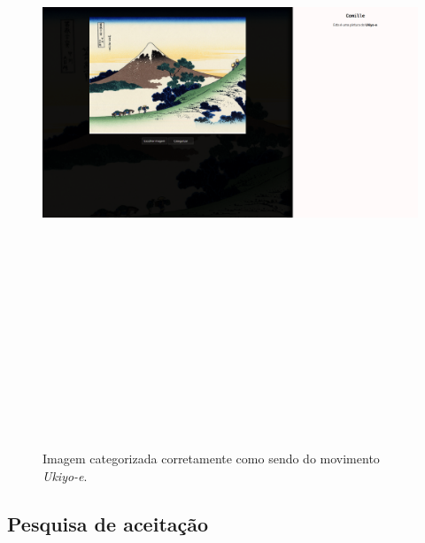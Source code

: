 \documentclass[12pt, a4paper]{article}
\begin{document}
\begin{figure}[H]
	\centering
	\includegraphics[width=\textwidth, height=20cm, keepaspectratio=true]{fig/site_imgcategorized}
	\caption{Imagem categorizada corretamente como sendo do movimento \emph{Ukiyo-e}.}
\end{figure}

\subsection{Pesquisa de aceitação}

\end{document}
